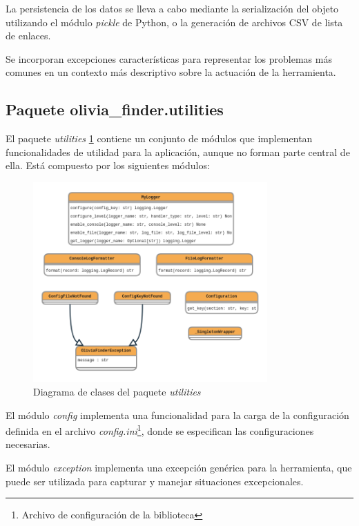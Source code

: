 La persistencia de los datos se lleva a cabo mediante la serialización del objeto utilizando el
módulo \textit{pickle} de Python, o la generación de archivos CSV de lista de enlaces.

Se incorporan excepciones características para representar los problemas más comunes en un contexto
más descriptivo sobre la actuación de la herramienta.


\subsection{Paquete olivia\_finder.utilities}

El paquete \textit{utilities} \ref{fig:utilities_classes} contiene un conjunto de módulos que implementan funcionalidades de
utilidad para la aplicación, aunque no forman parte central de ella. Está compuesto por los siguientes módulos:

\begin{figure}[ht!]
    \centering
    \includegraphics[width=0.8\textwidth]{img/anexos/utilities_classes.png}
    \caption{Diagrama de clases del paquete \textit{utilities}}
    \label{fig:utilities_classes}
\end{figure}



El módulo \textit{config} implementa una funcionalidad para la carga de la configuración
definida en el archivo \textit{config.ini}\footnote{Archivo de configuración de la biblioteca}, donde se especifican las configuraciones necesarias.

El módulo \textit{exception} implementa una excepción genérica para la herramienta, que
puede ser utilizada para capturar y manejar situaciones excepcionales.

